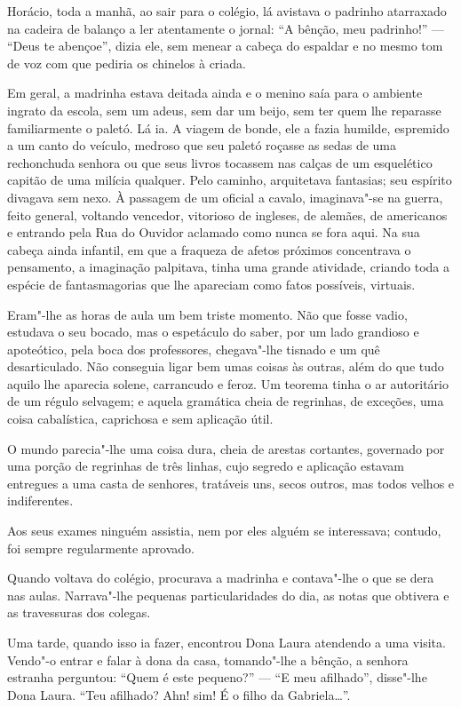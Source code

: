 Horácio, toda a manhã, ao sair para o colégio, lá avistava o padrinho
atarraxado na cadeira de balanço a ler atentamente o jornal: ``A bênção,
meu padrinho!'' --- ``Deus te abençoe'', dizia ele, sem menear a cabeça
do espaldar e no mesmo tom de voz com que pediria os chinelos à criada.

Em geral, a madrinha estava deitada ainda e o menino saía para o
ambiente ingrato da escola, sem um adeus, sem dar um beijo, sem ter quem
lhe reparasse familiarmente o paletó. Lá ia. A viagem de bonde, ele a
fazia humilde, espremido a um canto do veículo, medroso que seu paletó
roçasse as sedas de uma rechonchuda senhora ou que seus livros tocassem
nas calças de um esquelético capitão de uma milícia qualquer. Pelo
caminho, arquitetava fantasias; seu espírito divagava sem nexo. À
passagem de um oficial a cavalo, imaginava"-se na guerra, feito general,
voltando vencedor, vitorioso de ingleses, de alemães, de americanos e
entrando pela Rua do Ouvidor aclamado como nunca se fora aqui. Na sua
cabeça ainda infantil, em que a fraqueza de afetos próximos concentrava
o pensamento, a imaginação palpitava, tinha uma grande atividade,
criando toda a espécie de fantasmagorias que lhe apareciam como fatos
possíveis, virtuais.

Eram"-lhe as horas de aula um bem triste momento. Não que fosse vadio,
estudava o seu bocado, mas o espetáculo do saber, por um lado grandioso
e apoteótico, pela boca dos professores, chegava"-lhe tisnado e um quê
desarticulado. Não conseguia ligar bem umas coisas às outras, além do
que tudo aquilo lhe aparecia solene, carrancudo e feroz. Um teorema
tinha o ar autoritário de um régulo selvagem; e aquela gramática cheia
de regrinhas, de exceções, uma coisa cabalística, caprichosa e sem
aplicação útil.

O mundo parecia"-lhe uma coisa dura, cheia de arestas cortantes,
governado por uma porção de regrinhas de três linhas, cujo segredo e
aplicação estavam entregues a uma casta de senhores, tratáveis uns,
secos outros, mas todos velhos e indiferentes.

Aos seus exames ninguém assistia, nem por eles alguém se interessava;
contudo, foi sempre regularmente aprovado.

Quando voltava do colégio, procurava a madrinha e contava"-lhe o que se
dera nas aulas. Narrava"-lhe pequenas particularidades do dia, as notas
que obtivera e as travessuras dos colegas.

Uma tarde, quando isso ia fazer, encontrou Dona Laura atendendo a uma
visita. Vendo"-o entrar e falar à dona da casa, tomando"-lhe a bênção, a
senhora estranha perguntou: ``Quem é este pequeno?'' --- ``E meu
afilhado'', disse"-lhe Dona Laura. ``Teu afilhado? Ahn! sim! É o filho da
Gabriela\ldots{}''.

